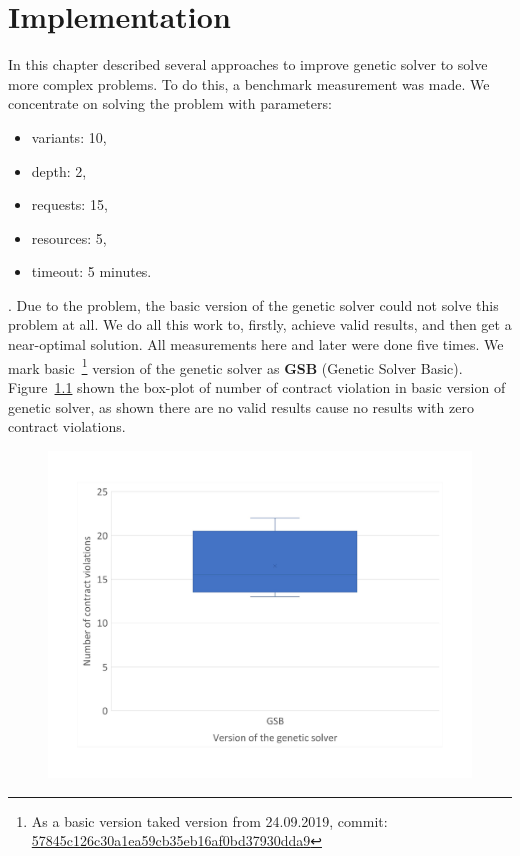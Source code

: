 \chapter{Implementation}\label{chapter:Implementation}
In this chapter described several approaches to improve genetic solver to solve more complex problems.
To do this, a benchmark measurement was made.
We concentrate on solving the problem with parameters:
\begin{itemize}
	\item variants: 10,
	\item depth: 2,
	\item requests: 15,
	\item resources: 5,
	\item timeout: 5 minutes.
\end{itemize}.
Due to the problem, the basic version of the genetic solver could not solve this problem at all. We do all this work to, firstly, achieve valid results, and then get a near-optimal solution. 
All measurements here and later were done five times.
We mark basic~\footnote{As a basic version taked version from 24.09.2019, commit: \href{https://git-st.inf.tu-dresden.de/mquat/mquat2/commit/57845c126c30a1ea59cb35eb16af0bd37930dda9}{57845c126c30a1ea59cb35eb16af0bd37930dda9}} version of the genetic solver as \textbf{GSB} (Genetic Solver Basic).
Figure~\ref{fig:boxplotsolverbasic} shown the box-plot of number of contract violation in basic version of genetic solver, as shown there are no valid results cause no results with zero contract violations.

\begin{figure}
	\centering
	\includegraphics[width=\textwidth]{images/BoxPlotSolverBasic}
	\caption[Boxplot with a number of contract violations for the basic version of genetic solver]{}
	\label{fig:boxplotsolverbasic}
\end{figure}


